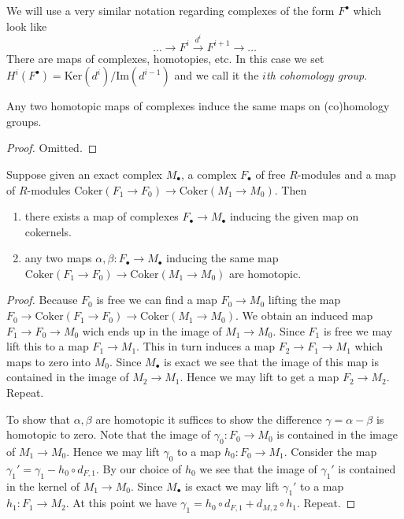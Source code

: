 \medskip\noindent
We will use a very similar notation regarding complexes
of the form $F^{\bullet}$ which look like
$$
\ldots \to F^i \xrightarrow{d^i} F^{i + 1} \to \ldots
$$
There are maps of complexes, homotopies, etc.
In this case we set $H^i(F^{\bullet}) =
\text{Ker}(d^i)/\text{Im}(d^{i - 1})$ and we call it
the {\it $i$th cohomology group}.

\begin{lemma}
\label{lemma-homotopic-equal-homology}
Any two homotopic maps of complexes induce the same maps on
(co)homology groups.
\end{lemma}

\begin{proof}
Omitted.
\end{proof}

\begin{lemma}
\label{lemma-compare-resolutions}
Suppose given an exact complex $M_{\bullet}$, a complex
$F_{\bullet}$ of free $R$-modules and a map
of $R$-modules $\text{Coker}(F_1 \to F_0) \to \text{Coker}(M_1 \to M_0)$.
Then
\begin{enumerate}
\item there exists a map of complexes $F_{\bullet}
\to M_{\bullet}$ inducing the given map on cokernels.
\item any two maps $\alpha, \beta : F_{\bullet}
\to M_{\bullet}$ inducing the same map
$\text{Coker}(F_1 \to F_0) \to \text{Coker}(M_1 \to M_0)$
are homotopic.
\end{enumerate}
\end{lemma}

\begin{proof}
Because $F_0$ is free we can find a map $F_0 \to M_0$
lifting the map $F_0 \to \text{Coker}(F_1 \to F_0)
\to \text{Coker}(M_1 \to M_0)$. We obtain an induced
map $F_1 \to F_0 \to M_0$ wich ends up in the image
of $M_1 \to M_0$. Since $F_1$ is free we may lift this
to a map $F_1 \to M_1$. This in turn induces a map
$F_2 \to F_1 \to M_1$ which maps to zero into
$M_0$. Since $M_{\bullet}$ is exact we see that
the image of this map is contained in the image
of $M_2 \to M_1$. Hence we may lift to get a map
$F_2 \to M_2$. Repeat.

\medskip\noindent
To show that $\alpha, \beta$ are homotopic it suffices
to show the difference $\gamma = \alpha - \beta$ is homotopic
to zero. Note that the image of $\gamma_0 : F_0 \to M_0$
is contained in the image of $M_1 \to M_0$. Hence we may lift
$\gamma_0$ to a map $h_0 : F_0 \to M_1$. Consider the map
$\gamma_1' = \gamma_1 - h_0 \circ d_{F, 1}$. By our choice of $h_0$
we see that the image of $\gamma_1'$ is contained in
the kernel of $M_1 \to M_0$. Since $M_{\bullet}$ is exact
we may lift $\gamma_1'$ to a map $h_1 : F_1 \to M_2$.
At this point we have $\gamma_1 = h_0 \circ d_{F, 1}
+ d_{M, 2} \circ h_1$. Repeat.
\end{proof}


